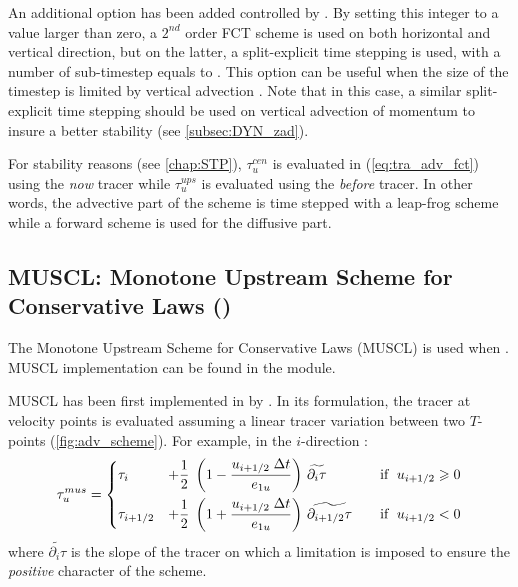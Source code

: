 \documentclass[../main/NEMO_manual]{subfiles}
\begin{document}
An additional option has been added controlled by .
By setting this integer to a value larger than zero,
a $2^{nd}$ order FCT scheme is used on both horizontal and vertical direction, but on the latter,
a split-explicit time stepping is used, with a number of sub-timestep equals to .
This option can be useful when the size of the timestep is limited by vertical advection \citep{Lemarie_OM2015}.
Note that in this case, a similar split-explicit time stepping should be used on vertical advection of momentum to
insure a better stability (see \autoref{subsec:DYN_zad}).

For stability reasons (see \autoref{chap:STP}),
$\tau_u^{cen}$ is evaluated in (\autoref{eq:tra_adv_fct}) using the \textit{now} tracer while
$\tau_u^{ups}$ is evaluated using the \textit{before} tracer.
In other words, the advective part of the scheme is time stepped with a leap-frog scheme
while a forward scheme is used for the diffusive part. 

\subsection{MUSCL: Monotone Upstream Scheme for Conservative Laws (\protect{})}
\label{subsec:TRA_adv_mus}

The Monotone Upstream Scheme for Conservative Laws (MUSCL) is used when .
MUSCL implementation can be found in the  module.

MUSCL has been first implemented in \NEMO by \citet{Levy_al_GRL01}.
In its formulation, the tracer at velocity points is evaluated assuming a linear tracer variation between
two $T$-points (\autoref{fig:adv_scheme}).
For example, in the $i$-direction :
\[
  \tau_u^{mus} = \left\{
    \begin{aligned}
      &\tau_i  &+ \frac{1}{2} \;\left( 1-\frac{u_{i+1/2} \;\Delta t}{e_{1u}} \right)
      &\ \widetilde{\partial _i \tau}  & \quad \text{if }\;u_{i+1/2} \geqslant 0      \\
      &\tau_{i+1/2} &+\frac{1}{2}\;\left( 1+\frac{u_{i+1/2} \;\Delta t}{e_{1u} } \right)
      &\ \widetilde{\partial_{i+1/2} \tau } & \text{if }\;u_{i+1/2} <0
    \end{aligned}
  \right.
\]
where $\widetilde{\partial _i \tau}$ is the slope of the tracer on which a limitation is imposed to
ensure the \textit{positive} character of the scheme.
\end{document}
